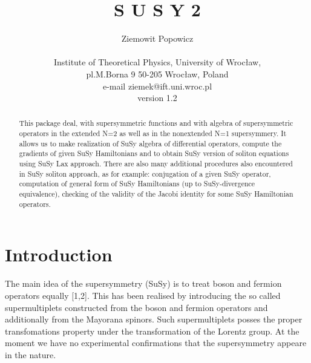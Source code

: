 \def\be{\begin{equation}}
\def\ee{\end{equation}}
\def\pe{\begin{eqnarray}}
\def\ke{\end{eqnarray}}
\topmargin=-2cm\textheight=23.5cm\textwidth=16cm
\oddsidemargin=0.25cm
\evensidemargin=0.25cm



                \title{S U S Y 2}

                \author{
        Ziemowit Popowicz \\ \\
        Institute of Theoretical Physics, University of Wroc{\l}aw,\\
        pl.M.Borna 9 50-205 Wroc{\l}aw, Poland \\
		e-mail ziemek@ift.uni.wroc.pl \\
                version 1.2}

\maketitle
\begin{abstract}
This package deal, with supersymmetric functions and with algebra
of supersymmetric operators in the extended N=2 as well as in the
nonextended N=1 supersymmery. It allows us
to make  realization of SuSy algebra of differential operators,
compute the gradients of given SuSy Hamiltonians and to obtain
SuSy version of soliton equations using SuSy Lax approach. There
are also many additional procedures also encountered in SuSy soliton
approach, as for example: conjugation of a given SuSy operator, computation
of general form of SuSy Hamiltonians (up to SuSy-divergence equivalence),
checking of the validity of the Jacobi identity for some SuSy
Hamiltonian operators.
\end{abstract}
\section{Introduction}

  The main idea of the supersymmetry (SuSy) is to treat boson and fermion
operators equally [1,2]. This has been realised by introducing the so called
supermultiplets constructed from the boson and fermion operators and
additionally from the Mayorana spinors. Such supermultiplets posses  the
proper transfomations property under the transformation of the Lorentz group.
At the moment we have no experimental confirmations that the supersymmetry
appeare in the nature.

